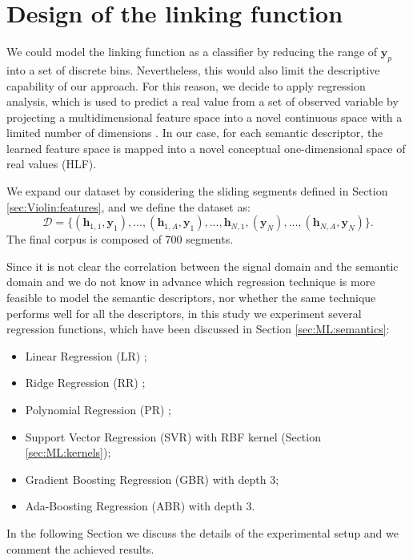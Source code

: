 \section{Design of the linking function} \label{subsec:Violin:regression}
We could model the linking function as a classifier by reducing the range of $\mathbf{y}_p$ into a set of discrete bins. Nevertheless, this would also limit the descriptive capability of our approach. For this reason, we decide to apply regression analysis, which is used to predict a real value from a set of observed variable by projecting a multidimensional feature space into a novel continuous space with a limited number of dimensions \cite{Yang2008}. In our case, for each semantic descriptor, the learned feature space is mapped into a novel conceptual one-dimensional space of real values (HLF). 

We expand our dataset by considering the sliding segments defined in Section \ref{sec:Violin:features}, and we define the dataset as:
\begin{equation}
\mathcal{D}=\{(\mathbf{h}_{1,1},  \mathbf{y}_1),..., (\mathbf{h}_{1,A},  \mathbf{y}_1),..., \mathbf{h}_{N,1},  (\mathbf{y}_N),..., (\mathbf{h}_{N,A},  \mathbf{y}_N) \}.
\end{equation}
The final corpus is composed of 700 segments. 

Since it is not clear the correlation between the signal domain and the semantic domain and we do not know in advance which regression technique is more feasible to model the semantic descriptors, nor whether the same technique performs well for all the descriptors, in this study we experiment several regression functions, which have been discussed in Section \ref{sec:ML:semantics}: 
\begin{itemize}
\item Linear Regression (LR) \cite{Sen1990};
\item Ridge Regression (RR) \cite{Sen1990};
\item Polynomial Regression (PR) \cite{Sen1990};
\item Support Vector Regression (SVR) \cite{Rho2009} with RBF kernel (Section \ref{sec:ML:kernels}); 
\item Gradient Boosting Regression (GBR) \cite{Zemel2001} with depth 3;
\item Ada-Boosting Regression (ABR) \cite{Solomatine2004} with depth 3.
\end{itemize}

In the following Section we discuss the details of the experimental setup and we comment the achieved results.

